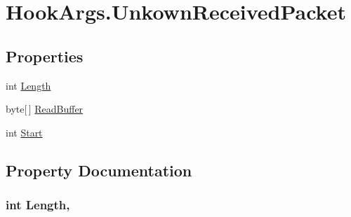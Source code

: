 \hypertarget{structOTA_1_1Plugin_1_1HookArgs_1_1UnkownReceivedPacket}{}\section{Hook\+Args.\+Unkown\+Received\+Packet}
\label{structOTA_1_1Plugin_1_1HookArgs_1_1UnkownReceivedPacket}
\subsection*{Properties}
\begin{DoxyCompactItemize}
\item 
int \hyperlink{structOTA_1_1Plugin_1_1HookArgs_1_1UnkownReceivedPacket_a9fde862c8bc443d7a6872a487ec265a3}{Length}
\item 
byte\mbox{[}$\,$\mbox{]} \hyperlink{structOTA_1_1Plugin_1_1HookArgs_1_1UnkownReceivedPacket_a5d469dd98be6477953e8b709e687f37b}{Read\+Buffer}
\item 
int \hyperlink{structOTA_1_1Plugin_1_1HookArgs_1_1UnkownReceivedPacket_a0b2c355629c0c41a383ab8db641304ee}{Start}
\end{DoxyCompactItemize}


\subsection{Property Documentation}
\hypertarget{structOTA_1_1Plugin_1_1HookArgs_1_1UnkownReceivedPacket_a9fde862c8bc443d7a6872a487ec265a3}{}
\subsubsection[{Length}]{\setlength{\rightskip}{0pt plus 5cm}int Length\hspace{0.3cm}{\ttfamily [get]}, {\ttfamily [set]}}\label{structOTA_1_1Plugin_1_1HookArgs_1_1UnkownReceivedPacket_a9fde862c8bc443d7a6872a487ec265a3}
\hypertarget{structOTA_1_1Plugin_1_1HookArgs_1_1UnkownReceivedPacket_a5d469dd98be6477953e8b709e687f37b}{}
